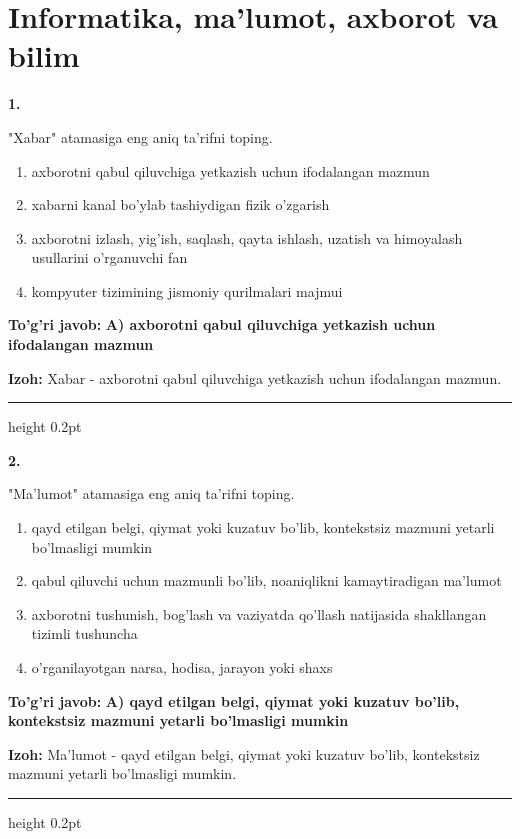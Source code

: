 \documentclass[10pt,a4paper,oneside]{article}
\begin{document}
\section{Informatika, ma'lumot, axborot va bilim}

\noindent\textbf{\color{ink}1.}
\par
"Xabar" atamasiga eng aniq ta'rifni toping.
\begin{enumerate}[label=\Alph*),leftmargin=9mm]
\item axborotni qabul qiluvchiga yetkazish uchun ifodalangan mazmun
\item xabarni kanal bo'ylab tashiydigan fizik o'zgarish
\item axborotni izlash, yig'ish, saqlash, qayta ishlash, uzatish va himoyalash usullarini o'rganuvchi fan
\item kompyuter tizimining jismoniy qurilmalari majmui
\end{enumerate}
\begin{tcolorbox}[enhanced,breakable,colback=teal!4,colframe=teal!50!black,boxrule=0.5pt,arc=1.1mm,left=3mm,right=3mm,top=1.7mm,bottom=1.7mm,before skip=2mm,after skip=2mm]
\textbf{\color{teal}To'g'ri javob:} \textbf{A) axborotni qabul qiluvchiga yetkazish uchun ifodalangan mazmun}
\par\smallskip
\textbf{Izoh:} Xabar - axborotni qabul qiluvchiga yetkazish uchun ifodalangan mazmun.
\end{tcolorbox}
\vspace{2mm}\hrule height 0.2pt \vspace{3mm}

\noindent\textbf{\color{ink}2.}
\par
"Ma'lumot" atamasiga eng aniq ta'rifni toping.
\begin{enumerate}[label=\Alph*),leftmargin=9mm]
\item qayd etilgan belgi, qiymat yoki kuzatuv bo'lib, kontekstsiz mazmuni yetarli bo'lmasligi mumkin
\item qabul qiluvchi uchun mazmunli bo'lib, noaniqlikni kamaytiradigan ma'lumot
\item axborotni tushunish, bog'lash va vaziyatda qo'llash natijasida shakllangan tizimli tushuncha
\item o'rganilayotgan narsa, hodisa, jarayon yoki shaxs
\end{enumerate}
\begin{tcolorbox}[enhanced,breakable,colback=teal!4,colframe=teal!50!black,boxrule=0.5pt,arc=1.1mm,left=3mm,right=3mm,top=1.7mm,bottom=1.7mm,before skip=2mm,after skip=2mm]
\textbf{\color{teal}To'g'ri javob:} \textbf{A) qayd etilgan belgi, qiymat yoki kuzatuv bo'lib, kontekstsiz mazmuni yetarli bo'lmasligi mumkin}
\par\smallskip
\textbf{Izoh:} Ma'lumot - qayd etilgan belgi, qiymat yoki kuzatuv bo'lib, kontekstsiz mazmuni yetarli bo'lmasligi mumkin.
\end{tcolorbox}
\vspace{2mm}\hrule height 0.2pt \vspace{3mm}
\end{document}
